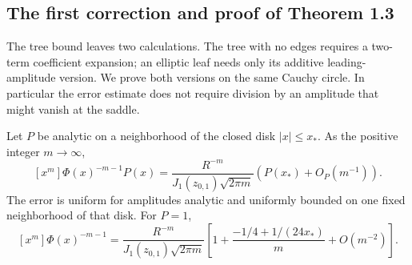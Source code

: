 \subsection{The first correction and proof of Theorem 1.3}
\label{subsec:s06:04}

The tree bound leaves two calculations. The tree with no edges requires a
two-term coefficient expansion; an elliptic leaf needs only its
additive leading-amplitude version. We prove both versions on the
same Cauchy circle. In particular the error estimate does not require
division by an amplitude that might vanish at the saddle.

\begin{lmm}\label{lmm:s06:saddle}
Let $P$ be analytic on a neighborhood of the closed disk
$|x|\leq x_*$. As the positive integer $m\to\infty$,
\begin{equation}\label{eq:s06:additive-saddle}
 [x^m]\Phi(x)^{-m-1}P(x)
 =\frac{R^{-m}}{J_1(z_{0,1})\sqrt{2\pi m}}
             \left(P(x_*)+O_P(m^{-1})\right).
\end{equation}
The error is uniform for amplitudes analytic and uniformly bounded
on one fixed neighborhood of that disk. For $P=1$,
\begin{equation}\label{eq:s06:two-term-saddle}
 [x^m]\Phi(x)^{-m-1}
 =\frac{R^{-m}}{J_1(z_{0,1})\sqrt{2\pi m}}
 \left[1+\frac{-1/4+1/(24x_*)}{m}+O(m^{-2})\right].
\end{equation}
\end{lmm}
